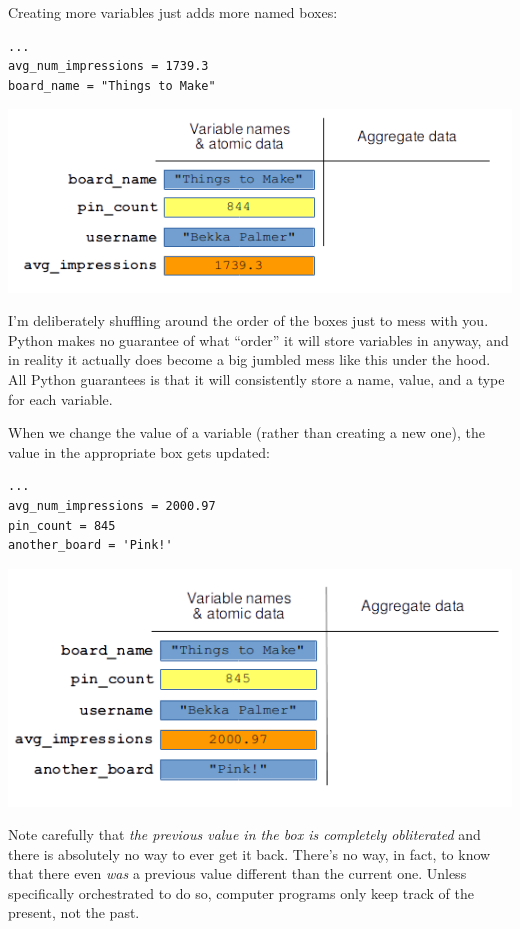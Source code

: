 Creating more variables just adds more named boxes:

\begin{Verbatim}[fontsize=\small,samepage=true,frame=single,framesep=3mm]
...
avg_num_impressions = 1739.3
board_name = "Things to Make"
\end{Verbatim}

\vspace{-.2in}
\begin{center}
\includegraphics[width=.8\textwidth]{memoryPicture3.png}
\end{center}

I'm deliberately shuffling around the order of the boxes just to mess with you.
Python makes no guarantee of what ``order'' it will store variables in anyway,
and in reality it actually does become a big jumbled mess like this under the
hood. All Python guarantees is that it will consistently store a name, value,
and a type for each variable.

When we change the value of a variable (rather than creating a new one), the
value in the appropriate box gets updated:

\begin{Verbatim}[fontsize=\small,samepage=true,frame=single,framesep=3mm]
...
avg_num_impressions = 2000.97
pin_count = 845
another_board = 'Pink!'
\end{Verbatim}

\vspace{-.2in}
\begin{center}
\includegraphics[width=.7\textwidth]{memoryPicture4.png}
\end{center}

Note carefully that \textit{the previous value in the box is completely
obliterated} and there is absolutely no way to ever get it back. There's no
way, in fact, to know that there even \textit{was} a previous value different
than the current one. Unless specifically orchestrated to do so, computer
programs only keep track of the present, not the past.

